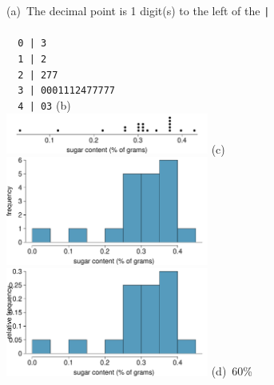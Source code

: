(a)~The decimal point is 1 digit(s) to the left of the \texttt{| \\
 \\
~~0 | 3 \\
~~1 | 2 \\
~~2 | 277 \\
~~3 | 0001112477777 \\
~~4 | 03}
(b)~\ \\
\includegraphics[width = 0.5\textwidth]{figures/cereal_sugar_dot}
(c)~ \ \\
\includegraphics[width = 0.5\textwidth]{figures/cereal_sugar_hist} \\
\includegraphics[width = 0.5\textwidth]{figures/cereal_sugar_relhist}
(d)~60\% 
